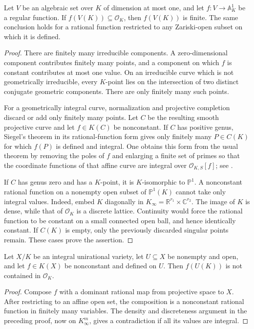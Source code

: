 \begin{lemma}\label{p2lb:curves}
Let $V$ be an algebraic set over $K$ of dimension at most one, and let
$f:V\to\mathbb A^1_K$ be a regular function.  If
$f(V(K))\subseteq\mathcal O_K$, then $f(V(K))$ is finite.
The same conclusion holds for a rational function restricted to any
Zariski-open subset on which it is defined.
\end{lemma}
\begin{proof}
There are finitely many irreducible components.  A zero-dimensional
component contributes finitely many points, and a component on which
$f$ is constant contributes at most one value.  On an irreducible curve
which is not geometrically irreducible, every $K$-point lies on the
intersection of two distinct conjugate geometric components.  There
are only finitely many such points.

For a geometrically integral curve, normalization and projective
completion discard or add only finitely many points.  Let $C$ be the
resulting smooth projective curve and let $f\in K(C)$ be nonconstant.
If $C$ has positive genus, Siegel's theorem in its rational-function
form gives only finitely many $P\in C(K)$ for which $f(P)$ is defined
and integral.  One obtains this form from the usual theorem by removing
the poles of $f$ and enlarging a finite set of primes so that the
coordinate functions of that affine curve are integral over
$\mathcal O_{K,S}[f]$; see \cite[Chapter~8]{lbLang1983}.

If $C$ has genus zero and has a $K$-point, it is $K$-isomorphic to
$\mathbb P^1$.  A nonconstant rational function on a nonempty open
subset of $\mathbb P^1(K)$ cannot take only integral values.  Indeed,
embed $K$ diagonally in
$K_\infty=\mathbb R^{r_1}\times\mathbb C^{r_2}$.  The image of $K$
is dense, while that of $\mathcal O_K$ is a discrete lattice.  Continuity
would force the rational function to be constant on a small connected
open ball, and hence identically constant.  If $C(K)$ is empty, only
the previously discarded singular points remain.  These cases prove
the assertion.
\end{proof}

\begin{lemma}\label{p2lb:unirational}
Let $X/K$ be an integral unirational variety, let $U\subseteq X$ be
nonempty and open, and let $f\in K(X)$ be nonconstant and defined on $U$.
Then $f(U(K))$ is not contained in $\mathcal O_K$.
\end{lemma}
\begin{proof}
Compose $f$ with a dominant rational map from projective space to $X$.
After restricting to an affine open set, the composition is a
nonconstant rational function in finitely many variables.  The density
and discreteness argument in the preceding proof, now on
$K_\infty^m$, gives a contradiction if all its values are integral.
\end{proof}

